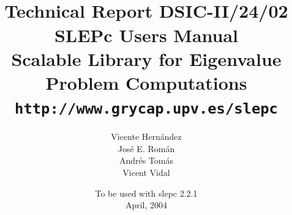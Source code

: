 \documentclass[titlepage,10pt,a4paper]{slepc}
\newcommand{\slepcversion}{2.2.1}
\newcommand{\packnoi}[1]{{\sc #1}\xspace}
\newcommand{\slepc}{\packnoi{slep\rm c}}
\newcommand{\slepchome}{http://www.grycap.upv.es/slepc}
\newcommand{\url}[1]{\texttt{#1}}
\begin{document}
\title{
 	\vspace*{-1cm}
	\\[2cm]
	\normalsize Technical Report DSIC-II/24/02
	\\[2cm]
	\vspace*{6mm}
	{\Large\bf\sffamily 
	SLEPc Users Manual\\[2mm]}
	{\large\bf\sffamily 
	Scalable Library for Eigenvalue Problem Computations}\\[2mm]
	\vspace*{6mm}
	\vspace*{6mm}
	\url{\slepchome}
	\\[6mm]
}

\author{
	Vicente Hern\'andez
	\\
	Jos\'e E. Rom\'an
	\\
	Andr\'es Tom\'as
	\\
	Vicent Vidal
	\\[2cm]
}

\date{
	To be used with \slepc \slepcversion\\
	April, 2004
}

{
\pagestyle{empty}
\maketitle
}

\setlength{\textheight}{14.99cm}
\setlength{\footskip}{2cm}
\setlength{\voffset}{2.3cm}

\pagestyle{empty}
\cleardoublepage
\end{document}

